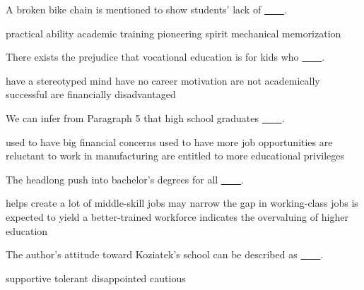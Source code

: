 \item A broken bike chain is mentioned to show students' lack of \uline{~~~~}.
\begin{tasks}
	\task practical ability
	\task academic training
	\task pioneering spirit
	\task mechanical memorization
\end{tasks}
\item There exists the prejudice that vocational education is for kids who \uline{~~~~}.
\begin{tasks}
	\task have a stereotyped mind
	\task have no career motivation
	\task are not academically successful
	\task are financially disadvantaged
\end{tasks}
\item We can infer from Paragraph 5 that high school graduates \uline{~~~~}.
\begin{tasks}
	\task used to have big financial concerns
	\task used to have more job opportunities
	\task are reluctant to work in manufacturing
	\task are entitled to more educational privileges
\end{tasks}
\item The headlong push into bachelor's degrees for all \uline{~~~~}.
\begin{tasks}
	\task helps create a lot of middle-skill jobs
	\task may narrow the gap in working-class jobs
	\task is expected to yield a better-trained workforce
	\task indicates the overvaluing of higher education
\end{tasks}
\item The author's attitude toward Koziatek's school can be described as \uline{~~~~}.
\begin{tasks}
	\task supportive
	\task tolerant
	\task disappointed
	\task cautious
\end{tasks}